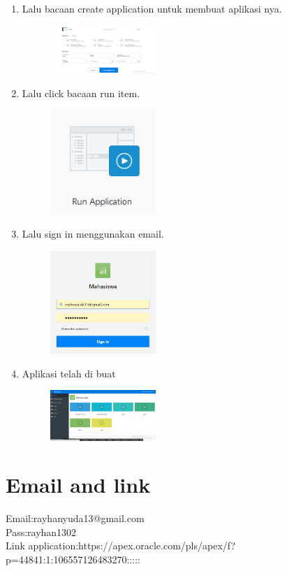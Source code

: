 \documentclass[a4paper,12pt]{report}
\begin{document}
\begin{enumerate}
\item
Lalu bacaan create application untuk membuat aplikasi nya.
\begin{figure}[h]
\includegraphics[width=4cm]{gambar/21.png}
\end{figure} 

\newpage
\item
Lalu click bacaan run item.
\begin{figure}[h]
\includegraphics[width=4cm]{gambar/22.png}
\end{figure} 

\item
Lalu sign in menggunakan email.
\begin{figure}[h]
\includegraphics[width=4cm]{gambar/23.png}
\end{figure}

\item
Aplikasi telah di buat
\begin{figure}[h]
\includegraphics[width=4cm]{gambar/24.png}
\end{figure} 
\end{enumerate}

\chapter*{Email and link}
Email:rayhanyuda13@gmail.com\\
Pass:rayhan1302\\
Link application:https://apex.oracle.com/pls/apex/f?p=44841:1:106557126483270:::::\\
\end{document}
